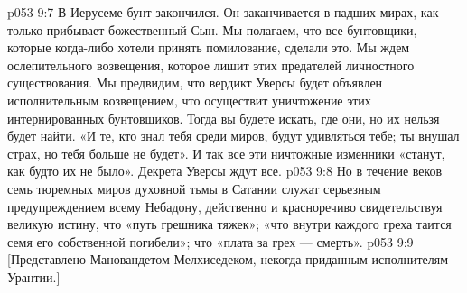 \vs p053 9:7 В Иерусеме бунт закончился. Он заканчивается в падших мирах, как только прибывает божественный Сын. Мы полагаем, что все бунтовщики, которые когда\hyp{}либо хотели принять помилование, сделали это. Мы ждем ослепительного возвещения, которое лишит этих предателей личностного существования. Мы предвидим, что вердикт Уверсы будет объявлен исполнительным возвещением, что осуществит уничтожение этих интернированных бунтовщиков. Тогда вы будете искать, где они, но их нельзя будет найти. «И те, кто знал тебя среди миров, будут удивляться тебе; ты внушал страх, но тебя больше не будет». И так все эти ничтожные изменники «станут, как будто их не было». Декрета Уверсы ждут все.
\vs p053 9:8 Но в течение веков семь тюремных миров духовной тьмы в Сатании служат серьезным предупреждением всему Небадону, действенно и красноречиво свидетельствуя великую истину, что «путь грешника тяжек»; «что внутри каждого греха таится семя его собственной погибели»; что «плата за грех --- смерть».
\vsetoff
\vs p053 9:9 [Представлено Мановандетом Мелхиседеком, некогда приданным исполнителям Урантии.]
